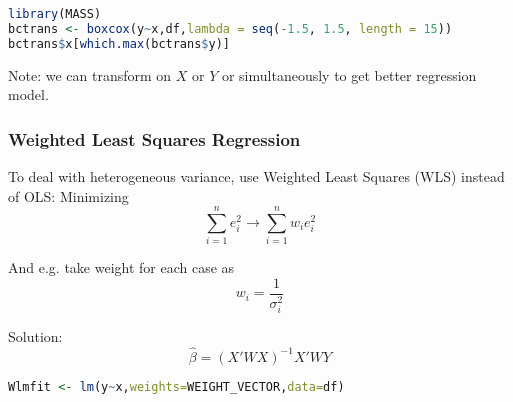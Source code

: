 \begin{itemize}[topsep=2pt,itemsep=2pt]
\begin{itemize}[topsep=2pt,itemsep=2pt]
                
            \end{itemize}
            
                
            
\begin{rcode}
\begin{lstlisting}[language=R]
library(MASS)
bctrans <- boxcox(y~x,df,lambda = seq(-1.5, 1.5, length = 15))
bctrans$x[which.max(bctrans$y)]
\end{lstlisting}

    \end{rcode}
            
            
        Note: we can transform on $ X $ or $ Y $ or simultaneously to get better regression model.
        
    \end{itemize}

\subsubsection{Weighted Least Squares Regression}
    To deal with heterogeneous variance, use Weighted Least Squares (WLS) instead of OLS: Minimizing
    \begin{equation}
        \sum_{i=1}^ne_i^2\longrightarrow \sum_{i=1}^nw_ie^2_i         
    \end{equation}
    
    And e.g. take weight for each case as 
    \begin{equation}
        w_i=\dfrac{1}{\sigma _i^2} 
    \end{equation}

    Solution:
    \begin{equation}
        \hat{\beta }=(X'WX)^{-1}X'WY 
    \end{equation}
    
    
\begin{rcode}
\begin{lstlisting}[language=R]
Wlmfit <- lm(y~x,weights=WEIGHT_VECTOR,data=df)
\end{lstlisting}
\end{rcode}
    
    
    







